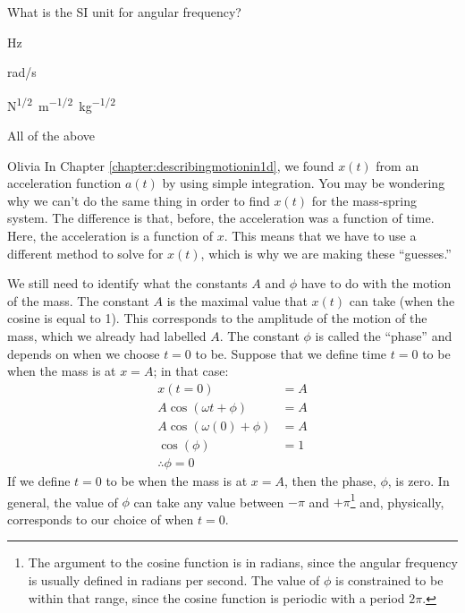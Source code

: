 \begin{checkpoint}\label{cp:simpleharmonicmotion:omega}
\begin{MCquestion}{What is the SI unit for angular frequency?}
\item \si{Hz}
\item \si{rad/s}
\item \si{N^{1/2}m^{-1/2}kg^{-1/2}}
\item All of the above \correct
\end{MCquestion}
\end{checkpoint}

\begin{studentOpinion}{Olivia}
In Chapter \ref{chapter:describingmotionin1d}, we found $x(t)$ from an acceleration function $a(t)$ by using simple integration. You may be wondering why we can't do the same thing in order to find $x(t)$ for the mass-spring system. The difference is that, before, the acceleration was a function of time. Here, the acceleration is a function of $x$. This means that we have to use a different method to solve for $x(t)$, which is why we are making these ``guesses.'' 
\end{studentOpinion}

We still need to identify what the constants $A$ and $\phi$ have to do with the motion of the mass. The constant $A$ is the maximal value that $x(t)$ can take (when the cosine is equal to 1). This corresponds to the amplitude of the motion of the mass, which we already had labelled $A$. The constant $\phi$ is called the ``phase'' and depends on when we choose $t=0$ to be. Suppose that we define time $t=0$ to be when the mass is at $x=A$; in that case:
\begin{align*}
x(t=0) &= A\\
A \cos(\omega t + \phi) &= A\\
A \cos(\omega (0) + \phi) &= A\\
\cos(\phi) &= 1\\
\therefore \phi = 0
\end{align*}
If we define $t=0$ to be when the mass is at $x=A$, then the phase, $\phi$, is zero. In general, the value of $\phi$ can take any value between $-\pi$ and $+\pi$\footnote{The argument to the cosine function is in radians, since the angular frequency is usually defined in radians per second. The value of $\phi$ is constrained to be within that range, since the cosine function is periodic with a period $2\pi$.} and, physically, corresponds to our choice of when $t=0$.

